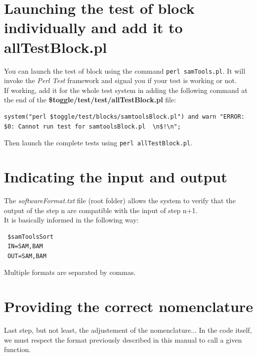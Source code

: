 \documentclass[a4paper,10pt]{report}
\begin{document}
\section{Launching the test of block individually and add it to allTestBlock.pl}

You can launch the test of block using the command \texttt{perl  samTools.pl}. It will invoke the \textit{Perl Test} framework and signal you if your test is working or not. \\

If working, add it for the whole test system in adding the following command at the end of the \textbf{\$toggle/test/test/allTestBlock.pl} file:

\begin{lstlisting}
system("perl $toggle/test/blocks/samtoolsBlock.pl") and warn "ERROR: $0: Cannot run test for samtoolsBlock.pl  \n$!\n";
\end{lstlisting}

Then launch the complete tests using \texttt{perl allTestBlock.pl}.








\section{Indicating the input and output}

The \emph{softwareFormat.txt} file (root folder) allows the system to verify that the output of the step n are compatible with the input of step n+1.\\

\noindent It is basically informed in the following way:

\begin{verbatim}
 $samToolsSort
 IN=SAM,BAM
 OUT=SAM,BAM
\end{verbatim}

\noindent Multiple formats are separated by commas.

\section{Providing the correct nomenclature}

Last step, but not least, the adjustement of the nomenclature... In the code itself, we must respect the format previously described in this manual to call a given function.
\end{document}
